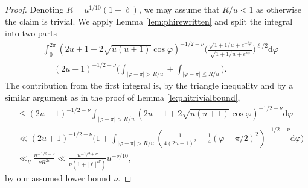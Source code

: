 \documentclass[10pt,a4paper]{amsart}
\renewcommand{\d}{\mathrm d}
\begin{document}
\begin{proof}
Denoting  $R=u^{1/10}(1+\ell)$, we may assume that $R/u < 1$ as otherwise the claim is trivial. We apply Lemma \ref{lem:phirewritten} and split the integral into two parts
    \begin{align*}
       & \int_0^{2\pi } (2u+1 + 2\sqrt{u(u+1)} \cos \varphi)^{-1/2-\nu}    \bigg(\frac{\sqrt{1+1/u} + e^{-i\varphi}}{\sqrt{1+1/u} + e^{i\varphi}}\bigg)^{\ell/2} 
 \d \varphi  \\
 &=    (2u+1)^{-1/2-\nu} \bigg(\int_{|\varphi -\pi | > R/u} + \int_{|\varphi-\pi| \leq R/u}\bigg) .
    \end{align*}
The contribution from the first integral is, by the triangle inequality and by a similar argument as in the proof of Lemma \ref{le:phitrivialbound},
\begin{align*}
    &\leq  (2u+1)^{-1/2-\nu}\int_{|\varphi -\pi | > R/u}  (2u+1 + 2\sqrt{u(u+1)} \cos \varphi)^{-1/2-\nu} \d \varphi 
 \\
 &\ll (2u+1)^{-1/2-\nu} \bigg( 1 +  \int_{|\varphi -\pi| > R/u} (\tfrac{1}{4(2u+1)^2} +\tfrac{1}{4}(\varphi-\pi/2)^2)^{-1/2-\nu}   
\d \varphi  \bigg)  \\
& \ll_\eta  \frac{u^{-1/2+ \nu}}{ \nu R^{2\nu}}  \ll \frac{u^{-1/2+ \nu}}{ \nu (1+|\ell|^{2\nu})}  u^{-\nu/10} ,
\end{align*}
by our assumed lower bound $\nu$. 


\end{proof}
\end{document}
